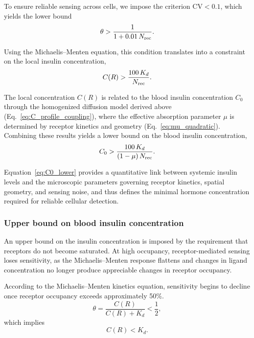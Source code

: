 To ensure reliable sensing across cells, we impose the criterion $\mathrm{CV} < 0.1$, which yields the lower bound
\begin{equation}
    \theta > \frac{1}{1 + 0.01\,N_{\mathrm{rec}}}.
    \label{eq:theta_lower}
\end{equation}

Using the Michaelis--Menten equation, this condition translates into a constraint on the local insulin concentration,
\begin{equation}
    C(R) > \frac{100\,K_d}{N_{\mathrm{rec}}}.
    \label{eq:CR_lower}
\end{equation}

The local concentration $C(R)$ is related to the blood insulin concentration $C_{0}$ through the homogenized diffusion model derived above (Eq.~\eqref{eq:C_profile_coupling}), where the effective absorption parameter $\mu$ is determined by receptor kinetics and geometry (Eq.~\eqref{eq:mu_quadratic}).
Combining these results yields a lower bound on the blood insulin concentration,
\begin{equation}
    C_{0} > \frac{100\,K_d}{(1 - \mu)\,N_{\mathrm{rec}}}.
    \label{eq:C0_lower}
\end{equation}

Equation~\eqref{eq:C0_lower} provides a quantitative link between systemic insulin levels and the microscopic parameters governing receptor kinetics, spatial geometry, and sensing noise, and thus defines the minimal hormone concentration required for reliable cellular detection.

\subsubsection{Upper bound on blood insulin concentration}\label{sec:upper_bound}
An upper bound on the insulin concentration is imposed by the requirement that receptors do not become saturated.
At high occupancy, receptor-mediated sensing loses sensitivity, as the Michaelis--Menten response flattens and changes in ligand concentration no longer produce appreciable changes in receptor occupancy.

According to the Michaelis--Menten kinetics equation, sensitivity begins to decline once receptor occupancy exceeds approximately 50\%.
\begin{equation}
    \theta = \frac{C(R)}{C(R) + K_d} < \frac{1}{2},
    \label{eq:theta_upper}
\end{equation}
which implies
\begin{equation}
    C(R) < K_d.
    \label{eq:CR_upper}
\end{equation}


